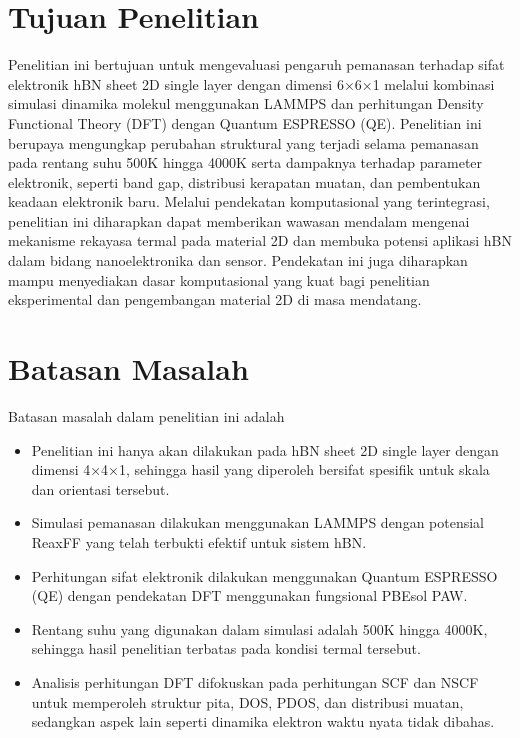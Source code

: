 \section{Tujuan Penelitian}
Penelitian ini bertujuan untuk mengevaluasi pengaruh pemanasan terhadap sifat elektronik hBN sheet 2D single layer dengan dimensi 6×6×1 melalui kombinasi simulasi dinamika molekul menggunakan LAMMPS dan perhitungan Density Functional Theory (DFT) dengan Quantum ESPRESSO (QE). Penelitian ini berupaya mengungkap perubahan struktural yang terjadi selama pemanasan pada rentang suhu 500K hingga 4000K serta dampaknya terhadap parameter elektronik, seperti band gap, distribusi kerapatan muatan, dan pembentukan keadaan elektronik baru. Melalui pendekatan komputasional yang terintegrasi, penelitian ini diharapkan dapat memberikan wawasan mendalam mengenai mekanisme rekayasa termal pada material 2D dan membuka potensi aplikasi hBN dalam bidang nanoelektronika dan sensor. Pendekatan ini juga diharapkan mampu menyediakan dasar komputasional yang kuat bagi penelitian eksperimental dan pengembangan material 2D di masa mendatang. 

\section{Batasan Masalah}
Batasan masalah dalam penelitian ini adalah
\begin{itemize}
    \item Penelitian ini hanya akan dilakukan pada hBN sheet 2D single layer dengan dimensi 4×4×1, sehingga hasil yang diperoleh bersifat spesifik untuk skala dan orientasi tersebut. 
    \item Simulasi pemanasan dilakukan menggunakan LAMMPS dengan potensial ReaxFF yang telah terbukti efektif untuk sistem hBN. 
    \item Perhitungan sifat elektronik dilakukan menggunakan Quantum ESPRESSO (QE) dengan pendekatan DFT menggunakan fungsional PBEsol PAW. 
    \item Rentang suhu yang digunakan dalam simulasi adalah 500K hingga 4000K, sehingga hasil penelitian terbatas pada kondisi termal tersebut. 
    \item Analisis perhitungan DFT difokuskan pada perhitungan SCF dan NSCF untuk memperoleh struktur pita, DOS, PDOS, dan distribusi muatan, sedangkan aspek lain seperti dinamika elektron waktu nyata tidak dibahas. 
\end{itemize}

